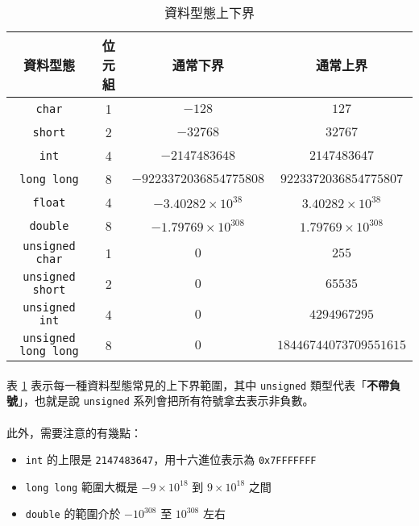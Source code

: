 \documentclass[12pt,a4paper,oneside]{report}
\begin{document}
\begin{CJK}{UTF8}{bkai}
\begin{table}[h!]
\centering
\begin{tabular}{|c|c|c|c|}
\hline
\textbf{資料型態} & \textbf{位元組} & \textbf{通常下界} & \textbf{通常上界}\\
\hline\hline
\lstinline!char!      & 1 & $-128$        & $127$       \\
\hline
\lstinline!short!     & 2 & $-32768$      & $32767$     \\
\hline
\lstinline!int!       & 4 & $-2147483648$ & $2147483647$\\
\hline
\lstinline!long long! & 8 & $-9223372036854775808$ & $9223372036854775807$\\
\hline
\lstinline!float!     & 4 & $-3.40282\times{10^{38}}$ & $3.40282\times{10^{38}}$\\
\hline
\lstinline!double!    & 8 & $-1.79769\times{10^{308}}$ & $1.79769\times{10^{308}}$\\
\hline
\lstinline!unsigned char!      & 1 & $0$ & $255$\\
\hline
\lstinline!unsigned short!     & 2 & $0$ & $65535$\\
\hline
\lstinline!unsigned int!       & 4 & $0$ & $4294967295$\\
\hline
\lstinline!unsigned long long! & 8 & $0$ & $18446744073709551615$\\
\hline
\end{tabular}
\caption{資料型態上下界}
\label{program:struct:table:datatype:limit}
\end{table}

\paragraph{}表 \ref{program:struct:table:datatype:limit} 表示每一種資料型態常見的上下界範圍，其中 \lstinline!unsigned! 類型代表「\textbf{不帶負號}」，也就是說 \lstinline!unsigned! 系列會把所有符號拿去表示非負數。
\paragraph{}此外，需要注意的有幾點：
\begin{itemize}
\item \lstinline!int! 的上限是 \lstinline!2147483647!，用十六進位表示為 \lstinline!0x7FFFFFFF!
\item \lstinline!long long! 範圍大概是 $-9\times{10^{18}}$ 到 $9\times{10^{18}}$ 之間
\item \lstinline!double! 的範圍介於 $-{10}^{308}$ 至 ${10}^{308}$ 左右
\end{itemize}

\end{CJK}
\end{document}
